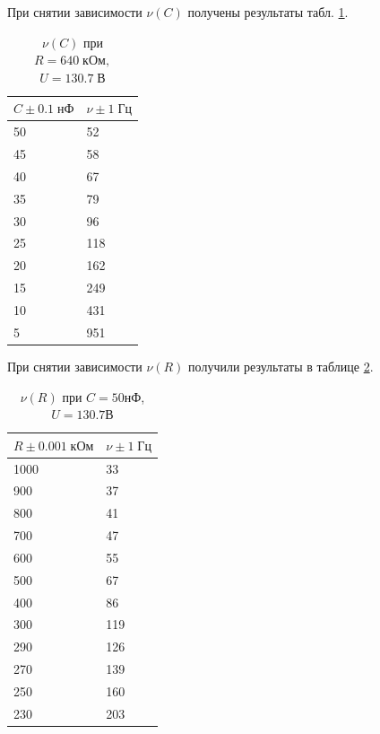 \documentclass[a4paper]{article}
\begin{document}
При снятии зависимости $ \nu(C) $ получены результаты табл. \ref{tab:c-nu}.
\begin{table}[h]
	\centering
	\begin{tabular}{|l|l|}
		\hline
		$C\pm 0.1\; нФ$ & $\nu \pm 1\; Гц$ \\ \hline
		50              & 52               \\ \hline
		45              & 58               \\ \hline
		40              & 67               \\ \hline
		35              & 79               \\ \hline
		30              & 96               \\ \hline
		25              & 118              \\ \hline
		20              & 162              \\ \hline
		15              & 249              \\ \hline
		10              & 431              \\ \hline
		5               & 951              \\ \hline
	\end{tabular}
	\caption{$\nu(C)$ при $R = 640\; кОм,$ $U = 130.7\; В$}
	\label{tab:c-nu}
\end{table}

При снятии зависимости $ \nu (R) $ получили результаты  в таблице \ref{tab:r-nu}.

\begin{table}[h]
	\centering
	\begin{tabular}{|l|l|}
		\hline
		$R\pm 0.001 \; кОм$ & $\nu\pm 1 \; Гц$ \\ \hline
		1000                & 33               \\ \hline
		900                 & 37               \\ \hline
		800                 & 41               \\ \hline
		700                 & 47               \\ \hline
		600                 & 55               \\ \hline
		500                 & 67               \\ \hline
		400                 & 86               \\ \hline
		300                 & 119              \\ \hline
		290                 & 126              \\ \hline
		270                 & 139              \\ \hline
		250                 & 160              \\ \hline
		230                 & 203              \\ \hline
	\end{tabular}
	\caption{$\nu (R)$ при $C = 50 нФ$, $U = 130.7 В$}
	\label{tab:r-nu}
\end{table}
\end{document}

